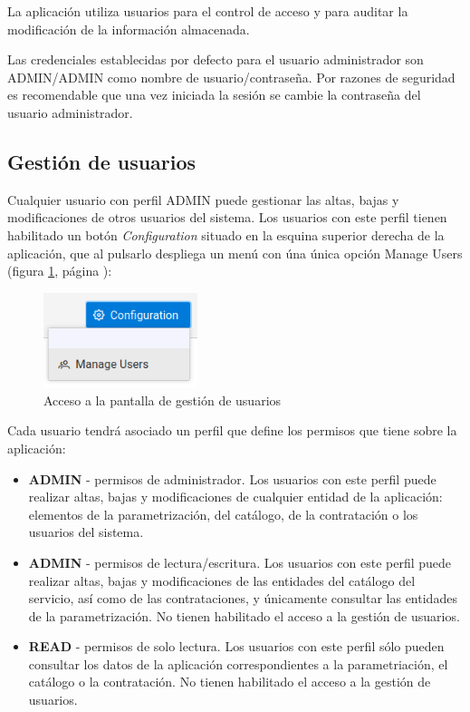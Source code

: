La aplicación utiliza usuarios para el control de acceso y para auditar la
modificación de la información almacenada.

Las credenciales establecidas por defecto para el usuario administrador son ADMIN/ADMIN como nombre de usuario/contraseña. Por razones de seguridad es recomendable que una vez iniciada la sesión se cambie la contraseña del usuario administrador.
 
 
 
\subsection{Gestión de usuarios}
\label{sub:gestion-usuarios}

Cualquier usuario con perfil ADMIN puede gestionar las altas, bajas y modificaciones de otros usuarios del sistema. Los usuarios con este perfil tienen habilitado un botón \emph{Configuration} situado en la esquina superior derecha de la aplicación, que al pulsarlo despliega un menú con úna única opción Manage Users (figura \ref{fig:boton-gestion-usuarios}, página \pageref{fig:boton-gestion-usuarios}):

\begin{figure}[H]
  \centering
  \includegraphics[width=0.40\textwidth]{imaxes/gestion-usuarios-01.png}
  \caption{Acceso a la pantalla de gestión de usuarios}
  \label{fig:boton-gestion-usuarios}
\end{figure}


Cada usuario tendrá asociado un perfil que define los permisos que tiene sobre la aplicación:

\begin{itemize}
\item \textbf{ADMIN} - permisos de administrador. Los usuarios con este perfil puede realizar altas, bajas y modificaciones de cualquier entidad de la aplicación: elementos de la parametrización, del catálogo, de la contratación o los usuarios del sistema.
\item \textbf{ADMIN} - permisos de lectura/escritura. Los usuarios con este perfil puede realizar altas, bajas y modificaciones de las entidades del catálogo del servicio, así como de las contrataciones, y únicamente consultar las entidades de la parametrización. No tienen habilitado el acceso a la gestión de usuarios.
\item \textbf{READ} - permisos de solo lectura. Los usuarios con este perfil sólo pueden consultar los datos de la aplicación correspondientes a la parametriación, el catálogo o la contratación. No tienen habilitado el acceso a la gestión de usuarios.
\end{itemize}


